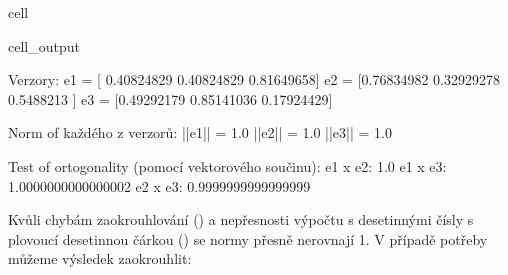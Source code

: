 \documentclass[letterpaper,10pt,english]{jupyterBook}
\begin{document}
\begin{sphinxuseclass}{cell}
\begin{sphinxVerbatimOutput}
\begin{sphinxuseclass}{cell_output}
\begin{sphinxVerbatim}[commandchars=\\\{\}]
Verzory: 
e1 = [ 0.40824829  0.40824829 \PYGZhy{}0.81649658] 
e2 = [\PYGZhy{}0.76834982 \PYGZhy{}0.32929278 \PYGZhy{}0.5488213 ] 
e3 = [\PYGZhy{}0.49292179  0.85141036  0.17924429]

Norm of každého z verzorů: 
||e1|| = 1.0 
||e2|| = 1.0 
||e3|| = 1.0

Test of ortogonality (pomocí vektorového součinu): 
e1 x e2: 1.0 
e1 x e3: 1.0000000000000002 
e2 x e3: 0.9999999999999999
\end{sphinxVerbatim}

\end{sphinxuseclass}\end{sphinxVerbatimOutput}

\end{sphinxuseclass}
\sphinxAtStartPar
Kvůli chybám zaokrouhlování () a nepřesnosti výpočtu s desetinnými čísly s plovoucí desetinnou čárkou () se normy přesně nerovnají 1.
V případě potřeby můžeme výsledek zaokrouhlit:
\end{document}
